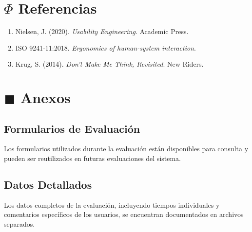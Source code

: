 \documentclass[12pt,a4paper]{article}
\begin{document}
\section{$\Phi$ Referencias}

\begin{enumerate}
    \item Nielsen, J. (2020). \textit{Usability Engineering}. Academic Press.
    \item ISO 9241-11:2018. \textit{Ergonomics of human-system interaction}.
    \item Krug, S. (2014). \textit{Don't Make Me Think, Revisited}. New Riders.
\end{enumerate}

\appendix

\section{$\blacksquare$ Anexos}

\subsection{Formularios de Evaluación}

Los formularios utilizados durante la evaluación están disponibles para consulta y pueden ser reutilizados en futuras evaluaciones del sistema.

\subsection{Datos Detallados}

Los datos completos de la evaluación, incluyendo tiempos individuales y comentarios específicos de los usuarios, se encuentran documentados en archivos separados.
\end{document}
